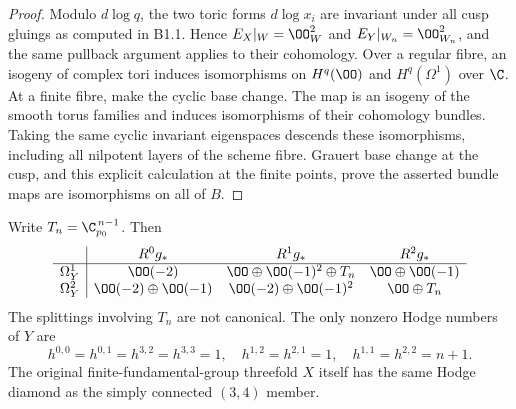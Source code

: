 \begin{proof}
Modulo $d\log q$, the two toric forms $d\log x_i$ are invariant
under all cusp gluings as computed in B1.1. Hence
$E_X|_W=\OO_W^2$ and $E_Y|_{W_n}=\OO_{W_n}^2$,
and the same pullback argument applies to their cohomology.
Over a regular fibre, an isogeny of complex tori induces isomorphisms
on $H^q(\OO)$ and $H^q(\Omega^1)$ over $\C$.
At a finite fibre, make the cyclic base change. The map is an isogeny
of the smooth torus families and induces isomorphisms of their
cohomology bundles. Taking the same cyclic invariant eigenspaces
descends these isomorphisms, including all nilpotent layers of the
scheme fibre. Grauert base change at the cusp, and this explicit
calculation at the finite points, prove the asserted bundle maps are
isomorphisms on all of $B$.
\end{proof}

\begin{proposition}\label{inv:B3.2}
Write $T_n=\C_{p_0}^{\,n-1}$. Then
\[
\begin{array}{c|ccc}
 &R^0g_*&R^1g_*&R^2g_*\\\hline
\Omega^1_Y&\OO(-2)&\OO\oplus\OO(-1)^2\oplus T_n&\OO\oplus\OO(-1)\\
\Omega^2_Y&\OO(-2)\oplus\OO(-1)&\OO(-2)\oplus\OO(-1)^2&\OO\oplus T_n
\end{array}
\]
The splittings involving $T_n$ are not canonical.
The only nonzero Hodge numbers of $Y$ are
\[
h^{0,0}=h^{0,1}=h^{3,2}=h^{3,3}=1,\quad
h^{1,2}=h^{2,1}=1,\quad h^{1,1}=h^{2,2}=n+1.
\]
The original finite-fundamental-group threefold $X$ itself has the
same Hodge diamond as the simply connected $(3,4)$ member.
\end{proposition}
